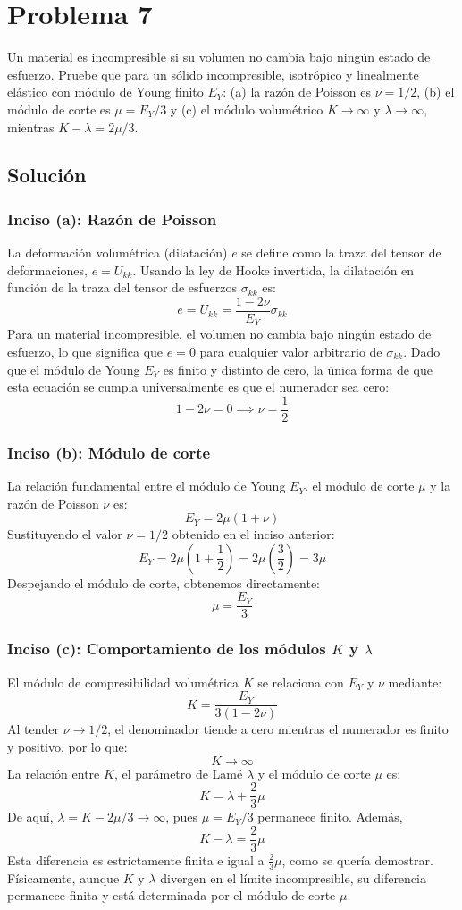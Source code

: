\documentclass[a4paper]{article}
\begin{document}
\section{Problema 7}

Un material es incompresible si su volumen no cambia bajo ningún estado de esfuerzo. Pruebe que para un sólido incompresible, isotrópico y linealmente elástico con módulo de Young finito $E_Y$: (a) la razón de Poisson es $\nu = 1/2$, (b) el módulo de corte es $\mu = E_Y/3$ y (c) el módulo volumétrico $K\to\infty$ y $\lambda\to\infty$, mientras $K-\lambda=2\mu/3$.

\subsection{Solución}

\subsubsection*{Inciso (a): Razón de Poisson}
La deformación volumétrica (dilatación) $e$ se define como la traza del tensor de deformaciones, $e = U_{kk}$. Usando la ley de Hooke invertida, la dilatación en función de la traza del tensor de esfuerzos $\sigma_{kk}$ es:
$$ e = U_{kk} = \frac{1 - 2\nu}{E_Y} \sigma_{kk} $$
Para un material incompresible, el volumen no cambia bajo ningún estado de esfuerzo, lo que significa que $e = 0$ para cualquier valor arbitrario de $\sigma_{kk}$. Dado que el módulo de Young $E_Y$ es finito y distinto de cero, la única forma de que esta ecuación se cumpla universalmente es que el numerador sea cero:
$$ 1 - 2\nu = 0 \implies \nu = \frac{1}{2} $$

\subsubsection*{Inciso (b): Módulo de corte}
La relación fundamental entre el módulo de Young $E_Y$, el módulo de corte $\mu$ y la razón de Poisson $\nu$ es:
$$ E_Y = 2\mu(1 + \nu) $$
Sustituyendo el valor $\nu = 1/2$ obtenido en el inciso anterior:
$$ E_Y = 2\mu \left(1 + \frac{1}{2}\right) = 2\mu \left(\frac{3}{2}\right) = 3\mu $$
Despejando el módulo de corte, obtenemos directamente:
$$ \mu = \frac{E_Y}{3} $$

\subsubsection*{Inciso (c): Comportamiento de los módulos $K$ y $\lambda$}
El módulo de compresibilidad volumétrica $K$ se relaciona con $E_Y$ y $\nu$ mediante:
$$ K = \frac{E_Y}{3(1 - 2\nu)} $$
Al tender $\nu \to 1/2$, el denominador tiende a cero mientras el numerador es finito y positivo, por lo que:
$$ K \to \infty $$
La relación entre $K$, el parámetro de Lamé $\lambda$ y el módulo de corte $\mu$ es:
$$ K = \lambda + \frac{2}{3}\mu $$
De aquí, $\lambda=K-2\mu/3\to\infty$, pues $\mu=E_Y/3$ permanece finito. Además,
$$ K - \lambda = \frac{2}{3}\mu $$
Esta diferencia es estrictamente finita e igual a $\frac{2}{3}\mu$, como se quería demostrar. Físicamente, aunque $K$ y $\lambda$ divergen en el límite incompresible, su diferencia permanece finita y está determinada por el módulo de corte $\mu$.
\end{document}
